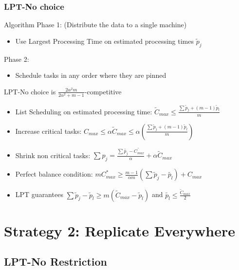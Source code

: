 \documentclass[usenames,dvipsnames]{beamer}
\begin{document}
\begin{frame}
  \frametitle{LPT-No choice}

  \begin{block}{Algorithm}
    Phase 1: (Distribute the data to a single machine)
    \begin{itemize}
    \item Use Largest Processing Time on estimated processing times $\tilde{p}_j$
    \end{itemize}
    Phase 2:
    \begin{itemize}
    \item Schedule tasks in any order where they are pinned
    \end{itemize}
  \end{block}

  \pause

  \begin{block}{LPT-No choice is $\frac{2\alpha^{2}m}{2\alpha^{2}+ m-1}$-competitive}
    \begin{itemize}
    \item List Scheduling on estimated processing time:
      $\tilde C_{max}\leq  \frac{\sum{\tilde p_j + (m-1) \tilde p_l} }{m}$
    \item Increase critical tasks: $C_{max}\leq \alpha \tilde C_{max}\leq \alpha \left ( \frac{\sum{\tilde p_j + (m-1) \tilde p_l} }{m} \right )$
    \item Shrink non critical tasks: $ \sum {p_j} = \frac{\sum \tilde{p_j}- \tilde{C_{max}}}{\alpha} + \alpha \tilde C_{max}$
    \item Perfect balance condition: $m C_{max}^{*}\geq \frac{m-1}{\alpha m} \left( \sum \tilde p_j - \tilde{p_l} \right) + {C_{max}}$

    \item LPT guarantees $\sum \tilde p_j-\tilde p_l \geq m (\tilde C_{max}-\tilde p_l)$ and $\tilde{p_l} \leq \frac{\tilde{C}_{max}}{2}$
    \end{itemize}
    
  \end{block}
\end{frame}

\section{Strategy 2: Replicate Everywhere}

\subsection{LPT-No Restriction}
\end{document}
